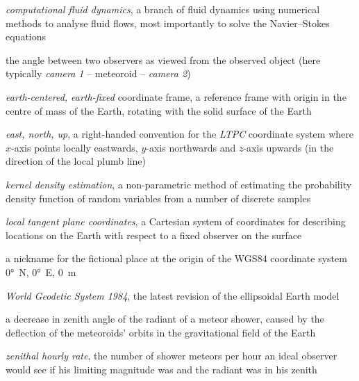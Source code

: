 \begin{description}[labelindent=0mm, leftmargin=40mm]
    \item[CFD]
        \emph{computational fluid dynamics}, a branch of fluid dynamics using numerical methods to analyse
        fluid flows, most importantly to solve the Navier--Stokes equations \citep{simscale-cfd}
    \item[convergence angle]
        the angle between two observers as viewed from the observed object
        (here typically \emph{camera 1} -- meteoroid -- \emph{camera 2})
    \item[ECEF]
        \emph{earth-centered, earth-fixed} coordinate frame, a reference frame with origin
        in the centre of mass of the Earth, rotating with the solid surface of the Earth
    \item[ENU]
        \emph{east, north, up}, a right-handed convention for the \emph{LTPC} coordinate system where
        $x$-axis points locally eastwards, $y$-axis northwards and $z$-axis upwards
        (in the direction of the local plumb line)
    \item[KDE]
        \emph{kernel density estimation}, a non-parametric method of estimating the probability density function
        of random variables from a number of discrete samples
    \item[LTPC]
        \emph{local tangent plane coordinates}, a Cartesian system of coordinates
        for describing locations on the Earth with respect to a fixed observer on the surface
    \item[Null Island]
        a nickname for the fictional place at the origin of the WGS84 coordinate system
        \ang{0}~N, \ang{0}~E, \SI{0}{\metre} \citep{null-island}
    \item[WGS84]
        \emph{World Geodetic System 1984}, the latest revision of the ellipsoidal Earth model \citep{nima-wgs84}
    \item[zenith attraction]
        a decrease in zenith angle of the radiant of a meteor shower,
        caused by the deflection of the meteoroids' orbits in the
        gravitational field of the Earth \citep{lovell1954}
    \item[ZHR]
        \emph{zenithal hourly rate}, the number of shower meteors per hour an ideal observer would see
        if his limiting magnitude was  and the radiant was in his zenith \citep{imo-glossary}
\end{description}

